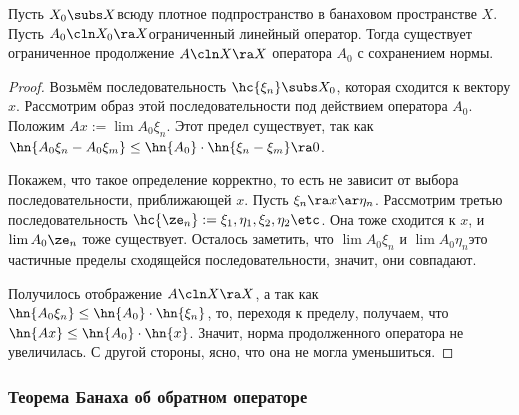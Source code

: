 \documentclass[a4paper]{article}
\begin{document}
\begin{stm}
Пусть $X_0 \subs X$\т всюду плотное подпространство в банаховом пространстве $X$.
Пусть $A_0\cln X_0 \ra X$\т ограниченный линейный оператор.
Тогда существует ограниченное продолжение $A\cln X\ra X$ оператора $A_0$ с сохранением нормы.
\end{stm}
\begin{proof}
Возьмём последовательность $\hc{\xi_n} \subs X_0$, которая сходится к вектору $x$.
Рассмотрим образ этой последовательности под действием оператора $A_0$.
Положим $Ax := \lim A_0 \xi_n$. Этот предел существует, так как
$\hn{A_0 \xi_n - A_0\xi_m} \le \hn{A_0}\cdot\hn{\xi_n-\xi_m} \ra 0$.

Покажем, что такое определение корректно, то есть не зависит от выбора последовательности,
приближающей $x$. Пусть $\xi_n \ra x \ar \eta_n$.
Рассмотрим третью последовательность $\hc{\ze_n} := \xi_1,\eta_1,\xi_2,\eta_2\etc$.
Она тоже сходится к $x$, и $\lim A_0 \ze_n$ тоже существует. Осталось заметить, что
$\lim A_0 \xi_n$ и $\lim A_0 \eta_n$\т это частичные пределы сходящейся последовательности,
значит, они совпадают.

Получилось отображение $A\cln X \ra X$, а так как
$\hn{A_0 \xi_n} \le \hn{A_0} \cdot \hn{\xi_n}$, то, переходя к пределу, получаем, что
$\hn{Ax} \le \hn{A_0} \cdot \hn{x}$. Значит, норма продолженного оператора не увеличилась.
С другой стороны, ясно, что она не могла уменьшиться.
\end{proof}

\subsubsection{Теорема Банаха об обратном операторе}
\end{document}
